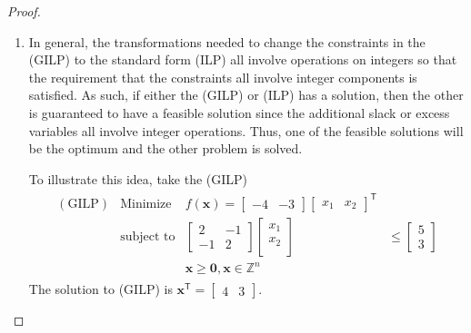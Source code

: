 \documentclass[12pt]{article}
\theoremstyle{definition}
\newcommand{\vc}[1]{\boldsymbol{#1}}
\newcommand{\tran}{\mathsf{T}}
\begin{document}
\begin{proof}
  \begin{enumerate}
    \item In general, the transformations needed to change the constraints in the (GILP) to the standard form
      (ILP) all involve operations on integers so that the requirement that the constraints all involve integer components is satisfied.
      As such, if either the (GILP) or (ILP) has a solution, then the other is guaranteed
      to have a feasible solution since the additional slack or excess variables all involve integer operations. Thus,
      one of the feasible solutions will be the optimum and the other problem is solved.

      To illustrate this idea, take the (GILP)
      \begin{align*}
        \begin{array}{rlrl}
          (\text{GILP}) & \text{Minimize} & f(\vc{x}) = \begin{bmatrix}-4 & -3\end{bmatrix}\begin{bmatrix}x_1 & x_2\end{bmatrix}^\tran& \\
          & \text{subject to} & \begin{bmatrix}2 & -1\\ -1 & 2\end{bmatrix}\begin{bmatrix}x_1\\x_2\\\end{bmatrix} &\leq \begin{bmatrix}5\\3\end{bmatrix} \\
          & & \vc{x}\geq \vc{0}, \vc{x}\in\mathbb{Z}^n
        \end{array}
      \end{align*}
      The solution to (GILP) is $\vc{x}^\tran = \begin{bmatrix}4&3\end{bmatrix}$.


\end{enumerate}
\end{proof}
\end{document}
